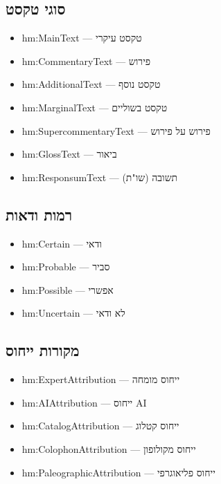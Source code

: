 \documentclass[12pt,a4paper]{article}
\newcommand{\new}[1]{\textcolor{newaddition}{#1}}
\begin{document}
\subsection{סוגי טקסט}

\begin{itemize}
\item hm:MainText — טקסט עיקרי
\item hm:CommentaryText — פירוש
\item hm:AdditionalText — טקסט נוסף
\item hm:MarginalText — טקסט בשוליים
\item hm:SupercommentaryText — פירוש על פירוש
\item hm:GlossText — ביאור
\item hm:ResponsumText — תשובה (שו"ת)
\end{itemize}

\subsection{\new{רמות ודאות}}

\begin{itemize}
\item \new{hm:Certain — ודאי}
\item \new{hm:Probable — סביר}
\item \new{hm:Possible — אפשרי}
\item \new{hm:Uncertain — לא ודאי}
\end{itemize}

\subsection{\new{מקורות ייחוס}}

\begin{itemize}
\item \new{hm:ExpertAttribution — ייחוס מומחה}
\item \new{hm:AIAttribution — ייחוס AI}
\item \new{hm:CatalogAttribution — ייחוס קטלוג}
\item \new{hm:ColophonAttribution — ייחוס מקולופון}
\item \new{hm:PaleographicAttribution — ייחוס פליאוגרפי}
\end{itemize}
\end{document}
